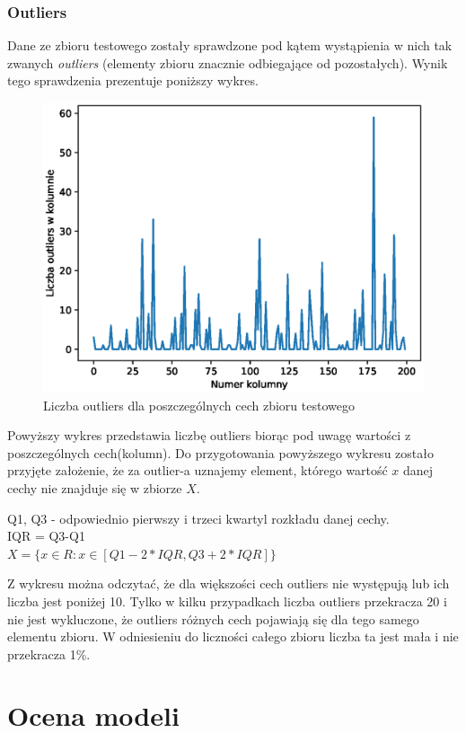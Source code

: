 \documentclass[12pt]{article}
\begin{document}
\subsubsection{Outliers}
Dane ze zbioru testowego zostały sprawdzone pod kątem wystąpienia w nich tak zwanych \textit{outliers} (elementy zbioru znacznie odbiegające od pozostałych). Wynik tego sprawdzenia prezentuje poniższy wykres.
\begin{figure}[H]
\centering 
\includegraphics[width = 472pt]{outliers.eps}
\caption{Liczba outliers dla poszczególnych cech zbioru testowego}
\label{outliers}
\end{figure}

Powyższy wykres przedstawia liczbę outliers biorąc pod uwagę wartości z poszczególnych cech(kolumn).
Do przygotowania powyższego wykresu zostało przyjęte założenie, że za outlier-a uznajemy element, którego wartość $x$ danej cechy nie znajduje się w zbiorze $X$.
\begin{center}
Q1, Q3 - odpowiednio pierwszy i trzeci kwartyl rozkładu danej cechy.\\
IQR = Q3-Q1\\
    $X=\{x\in R : x \in \left[Q1-2*IQR, Q3+2*IQR\right]\}$
\end{center}
Z wykresu można odczytać, że dla większości cech outliers nie występują lub ich liczba jest poniżej 10. Tylko w kilku przypadkach liczba outliers przekracza 20 i nie jest wykluczone, że outliers różnych cech pojawiają się dla tego samego elementu zbioru. W odniesieniu do liczności całego zbioru liczba ta jest mała i nie przekracza 1\%. 
\section{Ocena modeli}
\end{document}
